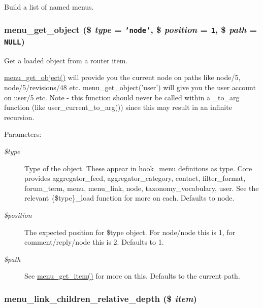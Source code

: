 Build a list of named menus. \hypertarget{group__menu_g8b1c8825ae7b6ae31b50cadaa1f7c920}{
\subsubsection[{menu\_\-get\_\-object}]{\setlength{\rightskip}{0pt plus 5cm}menu\_\-get\_\-object (\$ {\em type} = {\tt 'node'}, \/  \$ {\em position} = {\tt 1}, \/  \$ {\em path} = {\tt NULL})}}
\label{group__menu_g8b1c8825ae7b6ae31b50cadaa1f7c920}


Get a loaded object from a router item.

\hyperlink{group__menu_g8b1c8825ae7b6ae31b50cadaa1f7c920}{menu\_\-get\_\-object()} will provide you the current node on paths like node/5, node/5/revisions/48 etc. menu\_\-get\_\-object('user') will give you the user account on user/5 etc. Note - this function should never be called within a \_\-to\_\-arg function (like user\_\-current\_\-to\_\-arg()) since this may result in an infinite recursion.

\begin{Desc}
\item[Parameters:]
\begin{description}
\item[{\em \$type}]Type of the object. These appear in hook\_\-menu definitons as type. Core provides aggregator\_\-feed, aggregator\_\-category, contact, filter\_\-format, forum\_\-term, menu, menu\_\-link, node, taxonomy\_\-vocabulary, user. See the relevant \{\$type\}\_\-load function for more on each. Defaults to node. \item[{\em \$position}]The expected position for \$type object. For node/node this is 1, for comment/reply/node this is 2. Defaults to 1. \item[{\em \$path}]See \hyperlink{group__menu_g855b1ca6ef9e44eb6107a2b9d0f581df}{menu\_\-get\_\-item()} for more on this. Defaults to the current path. \end{description}
\end{Desc}
\hypertarget{group__menu_g75c0660b49841423d8d3c8908e9023fc}{
\subsubsection[{menu\_\-link\_\-children\_\-relative\_\-depth}]{\setlength{\rightskip}{0pt plus 5cm}menu\_\-link\_\-children\_\-relative\_\-depth (\$ {\em item})}}
\label{group__menu_g75c0660b49841423d8d3c8908e9023fc}


